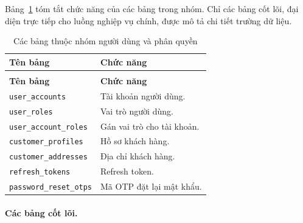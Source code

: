 Bảng~\ref{tab:data-summary-user-authorization} tóm tắt chức năng của các bảng trong nhóm. Chỉ các bảng cốt lõi, đại diện trực tiếp cho luồng nghiệp vụ chính, được mô tả chi tiết trường dữ liệu.

\begin{longtable}{|>{\RaggedRight\arraybackslash}p{}|>{\RaggedRight\arraybackslash}p{}|}
    \caption{Các bảng thuộc nhóm người dùng và phân quyền}
    \label{tab:data-summary-user-authorization} \\
    \hline
    \textbf{Tên bảng} & \textbf{Chức năng} \\
    \hline
    \endfirsthead
    \multicolumn{2}{c}{\tablename\ \thetable\ (tiếp theo)} \\
    \hline
    \textbf{Tên bảng} & \textbf{Chức năng} \\
    \hline
    \endhead
    \texttt{user\_accounts} & Tài khoản người dùng. \\
    \hline
    \texttt{user\_roles} & Vai trò người dùng. \\
    \hline
    \texttt{user\_account\_roles} & Gán vai trò cho tài khoản. \\
    \hline
    \texttt{customer\_profiles} & Hồ sơ khách hàng. \\
    \hline
    \texttt{customer\_addresses} & Địa chỉ khách hàng. \\
    \hline
    \texttt{refresh\_tokens} & Refresh token. \\
    \hline
    \texttt{password\_reset\_otps} & Mã OTP đặt lại mật khẩu. \\
    \hline
\end{longtable}

\paragraph{Các bảng cốt lõi.}

